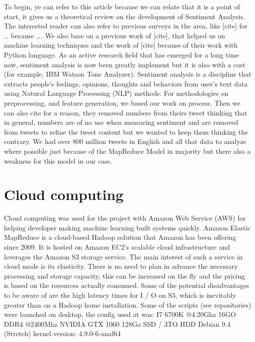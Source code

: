 \documentclass{acmtog} %
\begin{document}
To begin, ye can refer to this article \cite{Palpanas11} because we can relate that it is a point of start, it gives us a theoretical review on the development of Sentiment Analysis. The interested reader can also refer to previous surveys in the area, like [cite] for … because …. We also base on a previous work of [cite], that helped us on machine learning techniques and the work of [cite] because of their work with Python language. As an active research field that has emerged for a long time now, sentiment analysis is now been greatly implement but it is also with a cost (for example, IBM Watson Tone Analyzer). Sentiment analysis is a discipline that extracts people’s feelings, opinions, thoughts and behaviors from user’s text data using Natural Language Processing (NLP) methods. For methodologies on preprocessing, and feature generation, we based our work on process. Then we can also cite for a reason, they removed numbers from theirs tweet thinking that in general, numbers are of no use when measuring sentiment and are removed from tweets to refine the tweet content but we wanted to keep them thinking the contrary. We had over 800 million tweets in English and all that data to analyze where possible just because of the MapReduce Model in majority but there also a weakness for this model in our case.

\section{Cloud computing}
\label{sec:cloud}

Cloud computing was used for the project with Amazon Web Service (AWS) for helping developer making machine learning built systems quickly. 
Amazon Elastic MapReduce is a cloud-based Hadoop solution that Amazon has been offering since 2009. It is hosted on Amazon EC2's scalable cloud infrastructure and leverages the Amazon S3 storage service. The main interest of such a service in cloud mode is its elasticity. There is no need to plan in advance the necessary processing and storage capacity, this can be increased on the fly and the pricing is based on the resources actually consumed.
Some of the potential disadvantages to be aware of are the high latency times for I / O on S3, which is inevitably greater than on a Hadoop home installation. Some of the scripts (see repositories) were launched on desktop, the config used at was:
I7 6700K @4.20Ghz
16GO DDR4 @2400Mhz
NVIDIA GTX 1060
128Go SSD / 3TO HDD
Debian 9.4 (Stretch) kernel version: 4.9.0-6-amd64
\end{document}

